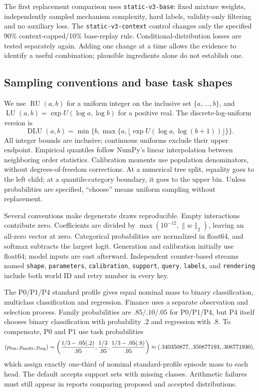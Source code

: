 \documentclass[11pt]{article}
\begin{document}
The first replacement comparison uses \texttt{static-v3-base}: fixed mixture weights, independently sampled mechanism complexity, hard labels, validity-only filtering and no auxiliary loss. The \texttt{static-v3-context} control changes only the specified 90\% context-capped/10\% base-replay rule. Conditional-distribution losses are tested separately again. Adding one change at a time allows the evidence to identify a useful combination; plausible ingredients alone do not establish one.

\subsection{Sampling conventions and base task shapes}

We use $\operatorname{RU}(a,b)$ for a uniform integer on the inclusive set $\{a,\ldots,b\}$, and $\operatorname{LU}(a,b)=\exp U(\log a,\log b)$ for a positive real. The discrete-log-uniform version is
\[
\operatorname{DLU}(a,b)=\min\{b,\max\{a,\lfloor\exp U(\log a,\log(b+1))\rfloor\}\}.
\]
All integer bounds are inclusive; continuous uniforms exclude their upper endpoint. Empirical quantiles follow NumPy's linear interpolation between neighboring order statistics. Calibration moments use population denominators, without degrees-of-freedom corrections. At a numerical tree split, equality goes to the left child; at a quantile-category boundary, it goes to the upper bin. Unless probabilities are specified, ``choose'' means uniform sampling without replacement.

Several conventions make degenerate draws reproducible. Empty interactions contribute zero. Coefficients are divided by $\max(10^{-12},\|w\|_2)$, leaving an all-zero vector at zero. Categorical probabilities are normalized in float64, and softmax subtracts the largest logit. Generation and calibration initially use float64; model inputs are cast afterward. Independent counter-based streams named \texttt{shape}, \texttt{parameters}, \texttt{calibration}, \texttt{support}, \texttt{query}, \texttt{labels}, and \texttt{rendering} include both world ID and retry number in every key.

The P0/P1/P4 standard profile gives equal nominal mass to binary classification, multiclass classification and regression. Finance uses a separate observation and selection process. Family probabilities are $.85/.10/.05$ for P0/P1/P4, but P4 itself chooses binary classification with probability $.2$ and regression with $.8$. To compensate, P0 and P1 use task probabilities
\[
(p_{\rm bin},p_{\rm multi},p_{\rm reg})=
\left(\frac{1/3-.05(.2)}{.95},\frac{1/3}{.95},
\frac{1/3-.05(.8)}{.95}\right)
\approx(.340350877,.350877193,.308771930),
\]
which assign exactly one-third of nominal standard-profile episode mass to each head. The default accepts support sets with missing classes. Arithmetic failures must still appear in reports comparing proposed and accepted distributions.
\end{document}
